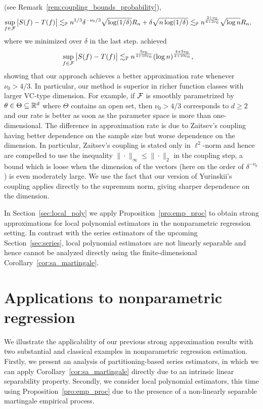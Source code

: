 (see Remark~\ref{rem:coupling_bounds_probability}),
%
\begin{align*}
  \sup_{f \in \mathcal{F}}
  \big| S(f) - T(f) \big|
  &\lesssim_{\mathbb{P}}
  n^{1/3} \delta^{-\nu_0/3}
  \sqrt{\log(1/\delta)} R_n
  + \delta \sqrt{n\log(1/\delta)}
  \lesssim_{\mathbb{P}}
  n^{\frac{2+\nu_0}{6+2\nu_0}}
  \sqrt{\log n} R_n,
\end{align*}
%
where we minimized over $\delta$ in the last step.
\citet[Proposition~1]{berthet2006revisiting} achieved
%
\begin{align*}
  \sup_{f \in \mathcal{F}}
  \big| S(f) - T(f) \big|
  &\lesssim_{\mathbb{P}}
  n^{\frac{5\nu_0}{4+10\nu_0}}
  (\log n)^{\frac{4+5\nu_0}{4+10\nu_0}},
\end{align*}
%
showing that our approach achieves a better approximation rate whenever
$\nu_0 > 4/3$. In particular, our method is superior in richer function classes
with larger VC-type dimension. For example, if $\mathcal{F}$ is smoothly parametrized
by $\theta \in \Theta \subseteq \mathbb{R}^d$ where $\Theta$ contains an open set, then
$\nu_0 > 4/3$ corresponds to $d \geq 2$ and our rate is better as soon as the
parameter space is more than one-dimensional. The difference in approximation
rate is due to Zaitsev's coupling having better dependence on the sample size
but worse dependence on the dimension. In particular, Zaitsev's coupling is
stated only in $\ell^2$-norm and hence
\citet[Equation~5.3]{berthet2006revisiting} are compelled to use the inequality
$\|\cdot\|_\infty \leq \|\cdot\|_2$ in the coupling step, a bound which is
loose when the dimension of the vectors (here on the order of
$\delta^{-\nu_0}$) is even moderately large. We use the fact that our version
of Yurinskii's coupling applies directly to the supremum norm, giving sharper
dependence on the dimension.

In Section~\ref{sec:local_poly} we apply Proposition~\ref{pro:emp_proc} to
obtain strong approximations for local polynomial estimators in the
nonparametric regression setting. In contrast with the series estimators of the
upcoming Section~\ref{sec:series}, local polynomial estimators are not linearly
separable and hence cannot be analyzed directly using the finite-dimensional
Corollary~\ref{cor:sa_martingale}.

\section{Applications to nonparametric regression}
\label{sec:nonparametric}

We illustrate the applicability of our previous strong approximation results
with two substantial and classical examples in nonparametric regression
estimation. Firstly, we present an analysis of partitioning-based series
estimators, in which we can apply Corollary~\ref{cor:sa_martingale} directly
due to an intrinsic linear separability property. Secondly, we consider local
polynomial estimators, this time using Proposition~\ref{pro:emp_proc} due to
the presence of a non-linearly separable martingale empirical process.

